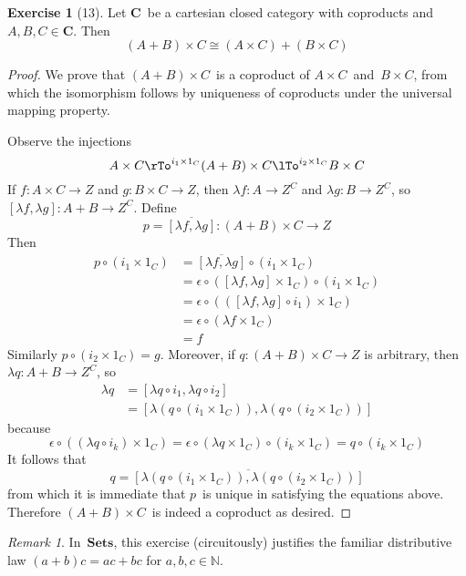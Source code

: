\documentclass[letterpaper,12pt]{article}
\newcommand{\N}{\mathbb{N}}
\newcommand{\iso}{\cong}
\newcommand{\after}{\circ}
\newcommand{\eval}{\epsilon}
\newcommand{\copair}[2]{[{#1},{#2}]}
\newcommand{\cat}[1]{\mathbf{#1}}
\newcommand{\curry}[1]{\lambda{#1}}
\newcommand{\uncurry}[1]{\overline{#1}}
\newcommand{\2}{\cat{2}}
\newcommand{\C}{\cat{C}}
\newcommand{\Sets}{\cat{Sets}}
\theoremstyle{definition}
\newtheorem*{exer}{Exercise}
\theoremstyle{remark}
\newtheorem*{rmk}{Remark}
\theoremstyle{direction}
\begin{document}
\begin{exer}[13]
Let \(\C\)~be a cartesian closed category with coproducts and \(A,B,C\in\C\). Then
\[(A+B)\times C\iso(A\times C)+(B\times C)\]
\end{exer}
\begin{proof}
We prove that \((A+B)\times C\)~is a coproduct of \(A\times C\)~and~\(B\times C\), from which the isomorphism follows by uniqueness of coproducts under the universal mapping property.

Observe the injections
\[A\times C\rTo^{i_1\times1_C}(A+B)\times C\lTo^{i_2\times1_C}B\times C\]
If \(f:A\times C\to Z\) and \(g:B\times C\to Z\), then \(\curry{f}:A\to Z^C\) and \(\curry{g}:B\to Z^C\), so \(\copair{\curry{f}}{\curry{g}}:A+B\to Z^C\). Define
\[p=\uncurry{\copair{\curry{f}}{\curry{g}}}:(A+B)\times C\to Z\]
Then
\begin{align*}
p\after(i_1\times1_C)&=\uncurry{\copair{\curry{f}}{\curry{g}}}\after(i_1\times1_C)\\
	&=\eval\after(\copair{\curry{f}}{\curry{g}}\times1_C)\after(i_1\times1_C)\\
	&=\eval\after((\copair{\curry{f}}{\curry{g}}\after i_1)\times1_C)\\
	&=\eval\after(\curry{f}\times1_C)\\
	&=f
\end{align*}
Similarly \(p\after(i_2\times1_C)=g\). Moreover, if \(q:(A+B)\times C\to Z\) is arbitrary, then \(\curry{q}:A+B\to Z^C\), so
\begin{align*}
\curry{q}&=\copair{\curry{q}\after i_1}{\curry{q}\after i_2}\\
	&=\copair{\curry{(q\after(i_1\times1_C))}}{\curry{(q\after(i_2\times1_C))}}
\end{align*}
because
\[\eval\after((\curry{q}\after i_k)\times1_C)=\eval\after(\curry{q}\times1_C)\after(i_k\times1_C)=q\after(i_k\times1_C)\]
It follows that
\[q=\uncurry{\copair{\curry{(q\after(i_1\times1_C))}}{\curry{(q\after(i_2\times1_C))}}}\]
from which it is immediate that \(p\)~is unique in satisfying the equations above. Therefore \((A+B)\times C\)~is indeed a coproduct as desired. 
\end{proof}
\begin{rmk}
In~\(\Sets\), this exercise (circuitously) justifies the familiar distributive law \((a+b)c=ac+bc\) for \(a,b,c\in\N\).
\end{rmk}
\end{document}
